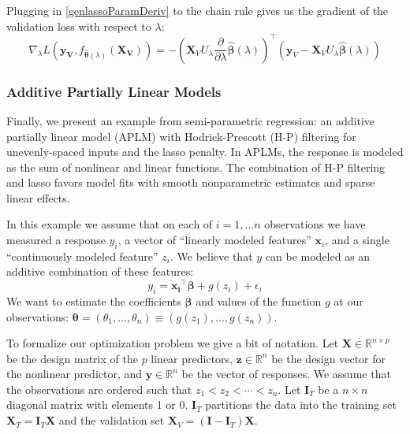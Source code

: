 \documentclass[10pt,letterpaper]{article}
\begin{document}
Plugging in \eqref{genlassoParamDeriv} to the chain rule gives us the gradient of the validation loss with respect to $\lambda$:
\begin{equation}
\nabla_{\lambda} L(\boldsymbol{y_V}, f_{\hat{\boldsymbol{\theta}}(\lambda)}(\boldsymbol{X_V})) = 
- \left (
\boldsymbol{X}_V U_\lambda
\frac{\partial}{\partial \lambda} \hat{\boldsymbol \beta}(\lambda)
\right )^\top
\left (
\boldsymbol{y}_V - \boldsymbol{X}_V U_\lambda \hat{\boldsymbol{\beta}} (\lambda)
\right )
\end{equation}

\subsubsection{Additive Partially Linear Models}\label{sec:aplm}

Finally, we present an example from semi-parametric regression: an additive partially linear model (APLM) with Hodrick-Prescott (H-P) filtering for unevenly-spaced inputs and the lasso penalty. In APLMs, the response is modeled as the sum of nonlinear and linear functions.  The combination of H-P filtering and lasso favors model fits with smooth nonparametric estimates and sparse linear effects.

In this example we assume that on each of $i=1,\ldots n$ observations we have measured a response $y_i$, a vector of ``linearly modeled features'' $\boldsymbol{x}_i$, and a single ``continuously modeled feature'' $z_i$. We believe that $y$ can be modeled as an additive combination of these features:
\begin{equation}
y_i = \boldsymbol{x_i}^\top \boldsymbol{\beta} + g(z_i) + \epsilon_i
\end{equation}
We want to estimate the coefficients $\boldsymbol{\beta}$ and values of the function $g$ at our observations: $\boldsymbol{\theta} = (\theta_1, ..., \theta_n) \equiv (g(z_1), ..., g(z_n))$.

To formalize our optimization problem we give a bit of notation. Let $\boldsymbol{X} \in \mathbb{R}^{n \times p}$ be the design matrix of the $p$ linear predictors, $\boldsymbol{z} \in \mathbb{R}^n$ be the design vector for the nonlinear predictor, and $\boldsymbol{y} \in \mathbb{R}^n$ be the vector of responses. We assume that the observations are ordered such that $z_1 < z_2 < \cdots < z_n$. Let $\boldsymbol{I}_T$ be a $n \times n$ diagonal matrix with elements 1 or 0. $\boldsymbol{I}_T$ partitions the data into the training set $\boldsymbol{X}_T= \boldsymbol{I}_T \boldsymbol{X}$ and the validation set $\boldsymbol{X}_V= (\boldsymbol{I} - \boldsymbol{I}_T) \boldsymbol{X}$.
\end{document}
